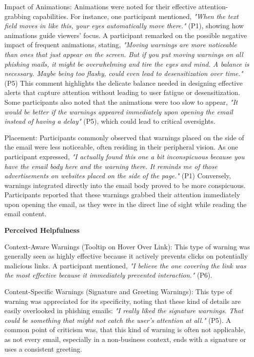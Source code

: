 \documentclass[
  a4paper,  %
  twoside,  %
  bibliography=totoc,
  headsepline,
  cleardoublepage=empty,
  parskip=half,
  draft=false
]{scrbook}
\begin{document}
Impact of Animations: Animations were noted for their effective attention-grabbing capabilities. For instance, one participant mentioned, \textit{"When the text field moves in like this, your eyes automatically move there."} (P1), showing how animations guide viewers' focus. A participant remarked on the possible negative impact of frequent animations, stating, \textit{"Moving warnings are more noticeable than ones that just appear on the screen. But if you put moving warnings on all phishing mails, it might be overwhelming and tire the eyes and mind. A balance is necessary. Maybe being too flashy, could even lead to desensitization over time."} (P5) This comment highlights the delicate balance needed in designing effective alerts that capture attention without leading to user fatigue or desensitization. Some participants also noted that the animations were too slow to appear, \textit{"It would be better if the warnings appeared immediately upon opening the email instead of having a delay"} (P5), which could lead to critical oversights. %
    
Placement: Participants commonly observed that warnings placed on the side of the email were less noticeable, often residing in their peripheral vision. As one participant expressed, \textit{"I actually found this one a bit inconspicuous because you have the email body here and the warning there. It reminds me of those advertisements on websites placed on the side of the page."} (P1) Conversely, warnings integrated directly into the email body proved to be more conspicuous. Participants reported that these warnings grabbed their attention immediately upon opening the email, as they were in the direct line of sight while reading the email content. 


\textbf{Perceived Helpfulness}

Context-Aware Warnings (Tooltip on Hover Over Link): This type of warning was generally seen as highly effective because it actively prevents clicks on potentially malicious links. A participant mentioned, \textit{"I believe the one covering the link was the most effective because it immediately prevented interaction."} (P6).
    
Content-Specific Warnings (Signature and Greeting Warnings): This type of warning was appreciated for its specificity, noting that these kind of details are easily overlooked in phishing emails: \textit{"I really liked the signature warnings. That could be something that might not catch the user’s attention at all."} (P5). A common point of criticism was, that this kind of warning is often not applicable, as not every email, especially in a non-business context, ends with a signature or uses a consistent greeting.
      
\end{document}

